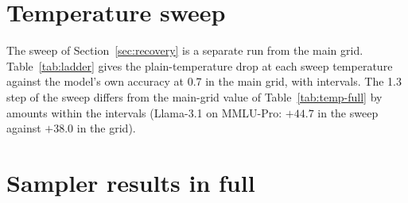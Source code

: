 \documentclass[10pt]{article}
\begin{document}
\begin{table}[t]\centering
\caption{Plain-temperature accuracy at Q8\_0 for all thirteen models, the drop from $T{=}0.7$ to
$1.3$ with its 95\% item-clustered interval (bold: lower limit at or above 15, a stricter
criterion than the fragility flag), and the change in capped and strict-parse rates. Models
sorted as in Figure~\ref{fig:drops}.}
\label{tab:temp-full}
\footnotesize\setlength{\tabcolsep}{4pt}
\end{table}

\begin{table}[t]\centering
\caption{Plain-temperature accuracy drop from $T{=}0.7$ to $1.3$ (pp, point estimates) at each
quantization level of the main grid (150 generations per cell).}
\label{tab:quant-drops}
\footnotesize\setlength{\tabcolsep}{4pt}
\end{table}

\begin{table}[t]\centering
\caption{Stratified MMLU-Pro subset against the fixed business subset: plain-temperature
accuracy at Q8\_0 and the drop with its interval.}
\label{tab:strat}
\footnotesize\setlength{\tabcolsep}{4pt}
\end{table}

\section{Temperature sweep}
\label{app:ladder}

The sweep of Section~\ref{sec:recovery} is a separate run from the main grid.
Table~\ref{tab:ladder} gives the plain-temperature drop at each sweep temperature against the
model's own accuracy at 0.7 in the main grid, with intervals. The 1.3 step of the sweep differs
from the main-grid value of Table~\ref{tab:temp-full} by amounts within the intervals
(Llama-3.1 on MMLU-Pro: $+44.7$ in the sweep against $+38.0$ in the grid).

\begin{table}[p]\centering
\caption{Plain-temperature accuracy drop at each sweep temperature against the model's own
$T{=}0.7$ accuracy in the main grid (pp, 95\% item-clustered intervals; Q8\_0).}
\label{tab:ladder}
\footnotesize\setlength{\tabcolsep}{6pt}
\end{table}

\FloatBarrier
\section{Sampler results in full}
\label{app:sampler}
\end{document}
